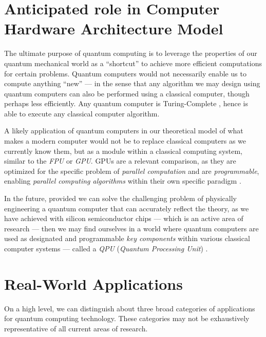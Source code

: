 \documentclass[conference]{IEEEtran}
\begin{document}
\section{Anticipated role in Computer Hardware Architecture Model}

The ultimate purpose of quantum computing is to leverage the properties of our quantum mechanical world as a ``shortcut'' to achieve more efficient computations for certain problems.
Quantum computers would not necessarily enable us to compute anything ``new'' — in the sense that any algorithm we may design using quantum computers can also be
performed using a classical computer, though perhaps less efficiently. Any quantum computer is Turing-Complete
\cite{ref:quantumvialinearalgebra}, hence is able to execute any classical computer algorithm.

A likely application of quantum computers in our theoretical model of what makes a modern computer would not be to replace classical computers
as we currently know them, but as a module within a classical computing system, similar to the
\textit{FPU}\cite{ref:wikipediaFPU} or \textit{GPU}.
GPUs are a relevant comparison, as they are optimized for the specific problem of \textit{parallel computation}
and are \textit{programmable}, enabling \textit{parallel computing algorithms} within their own specific paradigm \cite{ref:nvidiacudamanual, ref:amdromconlinedocs}.

In the future, provided we can solve the challenging problem of physically engineering a quantum computer that can accurately reflect the theory,
as we have achieved with silicon semiconductor chips
 — which is an active area of research \cite{ref:quantumcomputers2023article} —
then we may find ourselves in a world where quantum computers
are used as designated and programmable \textit{key components} within various classical computer systems — called a \textit{QPU} (\textit{Quantum Processing Unit}) \cite{ref:wikipediaQPUlist}.

\section{Real-World Applications}

On a high level, we can distinguish about three broad categories of applications for quantum computing technology.
These categories may not be exhaustively representative of all current areas of research.
\end{document}
